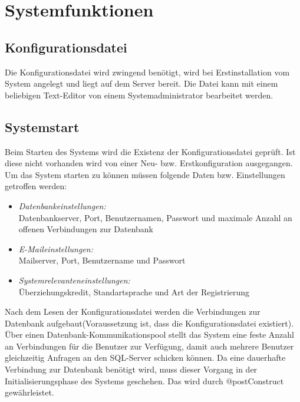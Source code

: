 \chapter{Systemfunktionen}

\section{Konfigurationsdatei}
	
		Die Konfigurationsdatei wird zwingend benötigt, wird bei Erstinstallation vom System angelegt und liegt auf dem Server bereit. Die Datei kann mit einem beliebigen Text-Editor von einem Systemadministrator bearbeitet werden.
	

\section{Systemstart}
		Beim Starten des Systems wird die Existenz der Konfigurationsdatei geprüft. Ist diese nicht vorhanden wird von einer Neu- bzw. Erstkonfiguration ausgegangen. Um das System starten zu können müssen folgende Daten bzw. Einstellungen getroffen werden:
		\begin{itemize}
			\item \emph{Datenbankeinstellungen:}\\
			 Datenbankserver, Port, Benutzernamen, Passwort und maximale Anzahl an offenen Verbindungen zur Datenbank
			\item \emph{E-Maileinstellungen:}\\
			 Mailserver, Port, Benutzername und Passwort
			\item \emph{Systemrelevanteneinstellungen:}\\
			 Überziehungskredit, Standartsprache und Art der Registrierung
		\end{itemize}
		Nach dem Lesen der Konfigurationsdatei werden die Verbindungen zur Datenbank aufgebaut(Voraussetzung ist, dass die Konfigurationsdatei existiert). Über einen Datenbank-Kommunikationspool stellt das System eine feste Anzahl an Verbindungen für die Benutzer zur Verfügung, damit auch mehrere Benutzer gleichzeitig Anfragen an den SQL-Server schicken können. Da eine dauerhafte Verbindung zur Datenbank benötigt wird, muss dieser Vorgang in der Initialisierungsphase des Systems geschehen. Das wird durch @postConstruct gewährleistet. 
	
